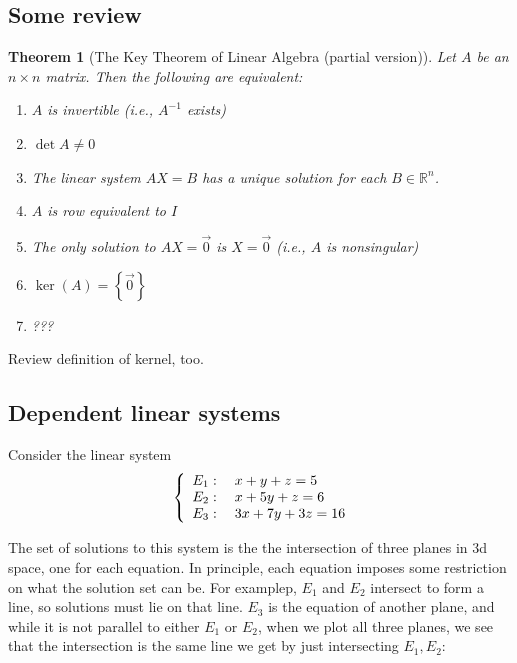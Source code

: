 \documentclass[10pt]{article}
\newtheorem{theorem}{Theorem}
\theoremstyle{definition}
\newcommand{\R}{\mathbb{R}}           %
\newcommand{\E}{\mathbb{E}}           %
\begin{document}
\subsection{Some review}

\begin{theorem}[The Key Theorem of Linear Algebra (partial version)]
  Let $A$ be an $n\times n$ matrix. Then the following are equivalent:
  \begin{enumerate}[label=(\roman*.)]
    \item $A$ is invertible (i.e., $A^{-1}$ exists)
    \item $\det A \neq 0$
    \item The linear system $AX=B$ has a unique solution for each $B\in
    \R^{n}$.
    \item $A$ is row equivalent to $I$
    \item The only solution to $AX=\vec{0}$ is $X=\vec{0}$ (i.e., $A$ is nonsingular)
    \item $\ker(A)= \left\{\vec{0}\right\}$
    \item ???
  \end{enumerate}
\end{theorem}

Review definition of kernel, too.


\subsection{Dependent linear systems}
Consider the linear system
\begin{equation*}
  \left\{ \begin{array}{l@{}l} E_{1}: \quad x+y+z=5  \\  E_{2}: \quad x+5y+z=6 \\E_{3}: \quad 3x+7y+3z=16 \end{array}\right.
\end{equation*}


The set of solutions to this system is the the intersection of three planes in
3d space, one for each equation. In principle, each equation imposes some
restriction on what the solution set can be. For examplep, $E_{1}$ and $E_{2}$
intersect to form a line, so solutions must lie on that line. $E_{3}$ is the
equation of another plane, and while it is not parallel to either $E_{1}$ or
$E_{2}$, when we plot all three planes, we see that the intersection is the
same line we get by just intersecting $E_{1},E_{2}$:
\end{document}
